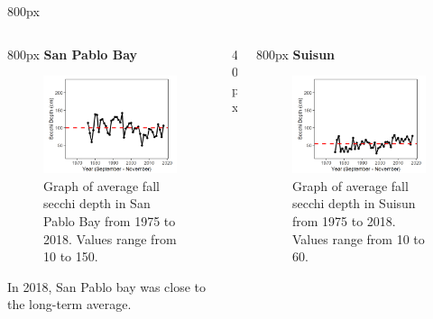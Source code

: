 \documentclass[
]{book}
\begin{document}
\begin{column}{800px\textwidth}
\end{column}

\begin{columns}[T]
\begin{column}{800px\textwidth}
\textbf{San Pablo Bay}

\begin{figure}
\includegraphics[width=15.25in]{figures/secchi_splfall} \caption{Graph of average fall secchi depth in San Pablo Bay from 1975 to 2018. Values range from 10 to 150.}\label{fig:unnamed-chunk-96}
\end{figure}

In 2018, San Pablo bay was close to the long-term average.
\end{column}

\begin{column}{40px\textwidth}
~
\end{column}

\begin{column}{800px\textwidth}
\textbf{Suisun}

\begin{figure}
\includegraphics[width=15.25in]{figures/secchi_ssfall} \caption{Graph of average fall secchi depth in Suisun from 1975 to 2018. Values range from 10 to 60.}\label{fig:unnamed-chunk-97}
\end{figure}


\end{column}
\end{columns}
\end{document}
